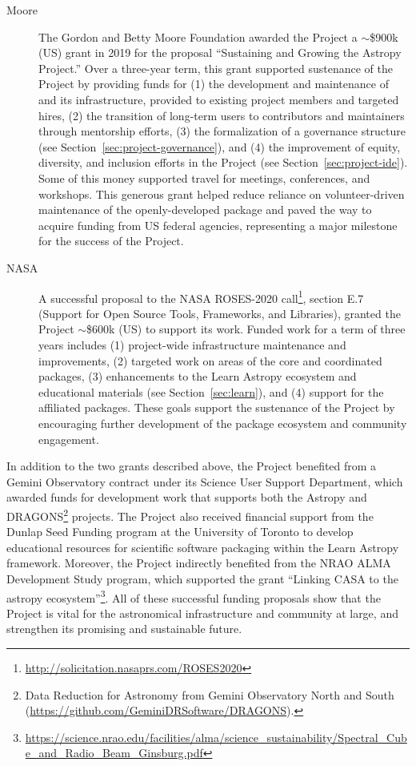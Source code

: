 \documentclass[modern]{aastex631}
\begin{document}
\begin{description}
    \item[Moore] The Gordon and Betty Moore Foundation awarded the \astropy
    Project a $\sim$\$900k (US) grant in 2019 for the proposal ``Sustaining and
    Growing the Astropy Project.'' Over a three-year term, this grant supported
    sustenance of the Project by providing funds for (1) the development and
    maintenance of \astropypkg and its infrastructure, provided to existing
    project members and targeted hires, (2) the transition of long-term users to
    contributors and maintainers through mentorship efforts, (3) the
    formalization of a governance structure (see
    Section~\ref{sec:project-governance}), and (4) the improvement of equity,
    diversity, and inclusion efforts in the Project (see
    Section~\ref{sec:project-ide}). Some of this money supported travel for
    meetings, conferences, and workshops. This generous grant helped reduce
    reliance on volunteer-driven maintenance of the openly-developed package and
    paved the way to acquire funding from US federal agencies, representing a
    major milestone for the success of the Project.

    \item[NASA] A successful proposal to the NASA ROSES-2020
    call\footnote{\url{http://solicitation.nasaprs.com/ROSES2020}}, section E.7
    (Support for Open Source Tools, Frameworks, and Libraries), granted the
    \astropy Project $\sim$\$600k (US) to support its work. Funded work for a
    term of three years includes (1) project-wide infrastructure maintenance and
    improvements, (2) targeted work on areas of the \astropy core and
    coordinated packages, (3) enhancements to the Learn
    Astropy ecosystem and educational materials (see Section~\ref{sec:learn}),
    and (4) support for the \astropy affiliated packages. These goals
    support the sustenance of the Project by encouraging further
    development of the package ecosystem and community engagement.
\end{description}

In addition to the two grants described above, the Project benefited from
a Gemini Observatory contract under its Science User Support Department,
which awarded funds for development work that supports both the Astropy and
DRAGONS\footnote{Data Reduction for Astronomy from Gemini Observatory North and
South (\url{https://github.com/GeminiDRSoftware/DRAGONS}).} projects. The
Project also received financial support from the Dunlap
Seed Funding program at the University of Toronto to develop educational
resources for scientific software packaging within the Learn Astropy
framework. Moreover, the Project indirectly benefited from the NRAO ALMA Development
Study program, which supported the grant ``Linking CASA to the astropy
ecosystem''\footnote{\url{https://science.nrao.edu/facilities/alma/science_sustainability/Spectral_Cube_and_Radio_Beam_Ginsburg.pdf}}.
All of these successful funding proposals show that the \astropy Project
is vital for the astronomical infrastructure and community at large, and
strengthen its promising and sustainable future.
\end{document}
